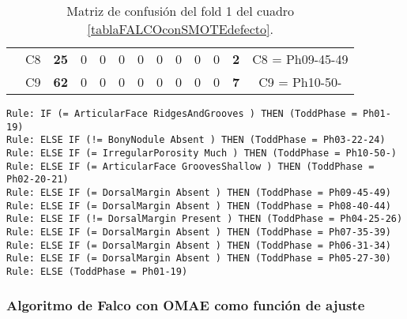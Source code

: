 \begin{table}[H]
{\begin{tabular}{|ccrrrrrrrrrrc|}
\multicolumn{1}{|c|}{}                                      & \multicolumn{1}{c|}{C8} & \multicolumn{1}{c|}{\textbf{25}} & \multicolumn{1}{c|}{0}  & \multicolumn{1}{c|}{0}          & \multicolumn{1}{c|}{0}  & \multicolumn{1}{c|}{0}  & \multicolumn{1}{c|}{0}  & \multicolumn{1}{c|}{0}  & \multicolumn{1}{c|}{0}  & \multicolumn{1}{c|}{0}  & \multicolumn{1}{c|}{\textbf{2}} & C8 = Ph09-45-49   \\ \cline{2-13}
\multicolumn{1}{|c|}{}                                      & \multicolumn{1}{c|}{C9} & \multicolumn{1}{c|}{\textbf{62}} & \multicolumn{1}{c|}{0}  & \multicolumn{1}{c|}{0}          & \multicolumn{1}{c|}{0}  & \multicolumn{1}{c|}{0}  & \multicolumn{1}{c|}{0}  & \multicolumn{1}{c|}{0}  & \multicolumn{1}{c|}{0}  & \multicolumn{1}{c|}{0}  & \multicolumn{1}{c|}{\textbf{7}} & C9 = Ph10-50-     \\ \hline
\end{tabular}%
}
\caption{Matriz de confusión del fold 1 del cuadro \ref{tablaFALCOconSMOTEdefecto}.}
\end{table}

\begin{lstlisting}
Rule: IF (= ArticularFace RidgesAndGrooves ) THEN (ToddPhase = Ph01-19)
Rule: ELSE IF (!= BonyNodule Absent ) THEN (ToddPhase = Ph03-22-24)
Rule: ELSE IF (= IrregularPorosity Much ) THEN (ToddPhase = Ph10-50-)
Rule: ELSE IF (= ArticularFace GroovesShallow ) THEN (ToddPhase = Ph02-20-21)
Rule: ELSE IF (= DorsalMargin Absent ) THEN (ToddPhase = Ph09-45-49)
Rule: ELSE IF (= DorsalMargin Absent ) THEN (ToddPhase = Ph08-40-44)
Rule: ELSE IF (!= DorsalMargin Present ) THEN (ToddPhase = Ph04-25-26)
Rule: ELSE IF (= DorsalMargin Absent ) THEN (ToddPhase = Ph07-35-39)
Rule: ELSE IF (= DorsalMargin Absent ) THEN (ToddPhase = Ph06-31-34)
Rule: ELSE IF (= DorsalMargin Absent ) THEN (ToddPhase = Ph05-27-30)
Rule: ELSE (ToddPhase = Ph01-19)
\end{lstlisting}


\subsubsection{Algoritmo de Falco con OMAE como función de ajuste}

